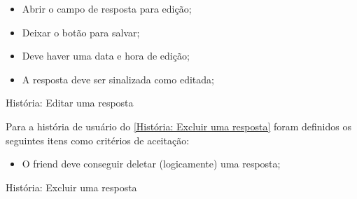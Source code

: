\begin{itemize}
\item Abrir o campo de resposta para edição;
\item Deixar o botão para salvar;
\item Deve haver uma data e hora de edição;
\item A resposta deve ser sinalizada como editada;
\end{itemize}

\def\arraystretch{2}
\begin{quadro}[htb]
\centering
\ABNTEXfontereduzida
\caption[História: Editar uma resposta]{História: Editar uma resposta}
\label{História: Editar uma resposta}
\end{quadro}
\FloatBarrier

Para a história de usuário do \autoref{História: Excluir uma resposta} foram definidos os seguintes itens como critérios de aceitação:

\begin{itemize}
\item O \gls{friend} deve conseguir deletar (logicamente) uma resposta;
\end{itemize}

\def\arraystretch{2}
\begin{quadro}[htb]
\centering
\ABNTEXfontereduzida
\caption[História: Excluir uma resposta]{História: Excluir uma resposta}
\label{História: Excluir uma resposta}
\end{quadro}
\FloatBarrier 

